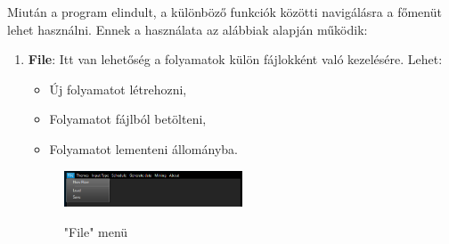 
Miután a program elindult, a különböző funkciók közötti navigálásra a főmenüt lehet használni. Ennek a használata az alábbiak alapján működik:
\begin{enumerate}
	\item{
		\textbf{File}: Itt van lehetőség a folyamatok külön fájlokként való kezelésére.
		Lehet: 
		\begin{itemize}
			\item{Új folyamatot létrehozni,}
			\item{Folyamatot fájlból betölteni,}
			\item{Folyamatot lementeni állományba.}
		\end{itemize}

		\begin{figure}[h]
			\begin{center}
				\caption{"File" menü}
				\includegraphics[width=0.5\textwidth, keepaspectratio=true]{images/img_ui_file}\\
				\label{fig:example}
			\end{center}
		\end{figure}

}
\end{enumerate}
